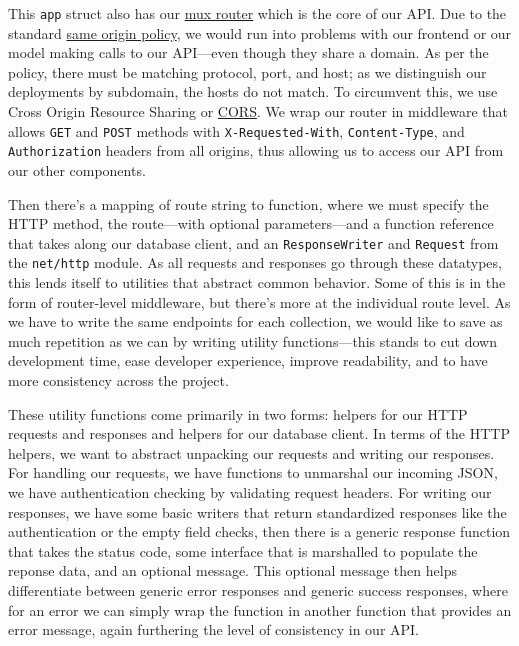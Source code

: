 \documentclass[11pt, twoside, reqno]{book}
\begin{document}
This \texttt{app} struct also has our \href{http://www.gorillatoolkit.org/pkg/mux}{mux router} which is the core of our API. Due to the standard \href{https://developer.mozilla.org/en-US/docs/Web/Security/Same-origin_policy}{same origin policy}, we would run into problems with our frontend or our model making calls to our API—even though they share a domain. As per the policy, there must be matching protocol, port, and host; as we distinguish our deployments by subdomain, the hosts do not match. To circumvent this, we use Cross Origin Resource Sharing or \href{https://developer.mozilla.org/en-US/docs/Web/HTTP/CORS}{CORS}. We wrap our router in middleware that allows \texttt{GET} and \texttt{POST} methods with \texttt{X-Requested-With}, \texttt{Content-Type}, and \texttt{Authorization} headers from all origins, thus allowing us to access our API from our other components.

Then there's a mapping of route string to function, where we must specify the HTTP method, the route—with optional parameters—and a function reference that takes along our database client, and an \texttt{ResponseWriter} and \texttt{Request} from the \texttt{net/http} module. As all requests and responses go through these datatypes, this lends itself to utilities that abstract common behavior. Some of this is in the form of router-level middleware, but there's more at the individual route level. As we have to write the same endpoints for each collection, we would like to save as much repetition as we can by writing utility functions—this stands to cut down development time, ease developer experience, improve readability, and to have more consistency across the project.

These utility functions come primarily in two forms: helpers for our HTTP requests and responses and helpers for our database client. In terms of the HTTP helpers, we want to abstract unpacking our requests and writing our responses. For handling our requests, we have functions to unmarshal our incoming JSON, we have authentication checking by validating request headers. For writing our responses, we have some basic writers that return standardized responses like the authentication or the empty field checks, then there is a generic response function that takes the status code, some interface that is marshalled to populate the reponse data, and an optional message. This optional message then helps differentiate between generic error responses and generic success responses, where for an error we can simply wrap the function in another function that provides an error message, again furthering the level of consistency in our API.
\end{document}
